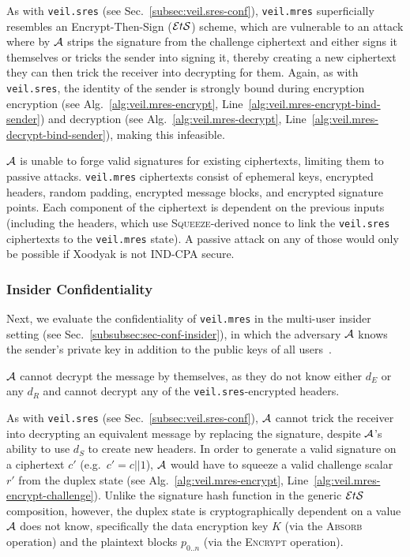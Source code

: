 As with \texttt{veil.sres} (see Sec.~\ref{subsec:veil.sres-conf}), \texttt{veil.mres} superficially resembles an
Encrypt-Then-Sign ($\mathcal{E}t\mathcal{S}$) scheme, which are vulnerable to an attack where by $\mathcal{A}$ strips the signature from the
challenge ciphertext and either signs it themselves or tricks the sender into signing it, thereby creating a new
ciphertext they can then trick the receiver into decrypting for them.
Again, as with \texttt{veil.sres}, the identity of the sender is strongly bound during encryption
encryption (see Alg.~\ref{alg:veil.mres-encrypt}, Line~\ref{alg:veil.mres-encrypt-bind-sender}) and decryption
(see Alg.~\ref{alg:veil.mres-decrypt}, Line~\ref{alg:veil.mres-decrypt-bind-sender}), making this infeasible.

$\mathcal{A}$ is unable to forge valid signatures for existing ciphertexts, limiting them to passive attacks.
\texttt{veil.mres} ciphertexts consist of ephemeral keys, encrypted headers, random padding, encrypted message blocks,
and encrypted signature points.
Each component of the ciphertext is dependent on the previous inputs (including the headers, which use
\textsc{Squeeze}-derived nonce to link the \texttt{veil.sres} ciphertexts to the \texttt{veil.mres} state).
A passive attack on any of those would only be possible if Xoodyak is not IND-CPA secure.

\subsubsection{Insider Confidentiality}

Next, we evaluate the confidentiality of \texttt{veil.mres} in the multi-user insider setting
(see Sec.~\ref{subsubsec:sec-conf-insider}), in which the adversary $\mathcal{A}$ knows the sender's private key in
addition to the public keys of all users~\cite[p. 45--46]{baek2010}.

$\mathcal{A}$ cannot decrypt the message by themselves, as they do not know either $d_E$ or any $d_R$ and cannot decrypt
any of the \texttt{veil.sres}-encrypted headers.

As with \texttt{veil.sres} (see Sec.~\ref{subsec:veil.sres-conf}),
$\mathcal{A}$ cannot trick the receiver into decrypting an equivalent message by replacing the signature, despite
$\mathcal{A}$'s ability to use $d_S$ to create new headers.
In order to generate a valid signature on a ciphertext $c'$ (e.g.\ $c'=c||1$), $\mathcal{A}$ would have to squeeze a
valid challenge scalar $r'$ from the duplex state (see Alg.~\ref{alg:veil.mres-encrypt},
Line~\ref{alg:veil.mres-encrypt-challenge}).
Unlike the signature hash function in the generic $\mathcal{E}t\mathcal{S}$ composition, however, the duplex state is cryptographically
dependent on a value $\mathcal{A}$ does not know, specifically the data encryption key $K$ (via the \textsc{Absorb}
operation) and the plaintext blocks $p_{0..n}$ (via the \textsc{Encrypt} operation).

